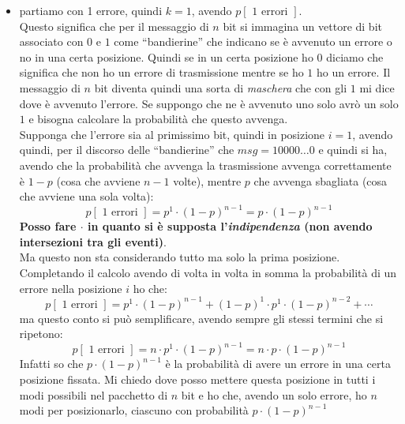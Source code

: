 \documentclass[a4paper,12pt, oneside]{book}
\begin{document}
\begin{itemize}
  \item partiamo con 1 errore, quindi $k=1$, avendo $p[\mbox{ 1 errori }]$.\\
  Questo significa che per il messaggio di $n$ bit si immagina un vettore di bit
  associato con $0$ e $1$ come
  ``bandierine'' che indicano se è avvenuto un errore o no in una certa
  posizione. Quindi se in un 
  certa posizione ho $0$ diciamo che significa che non ho un errore di
  trasmissione mentre se ho $1$ ho un errore. Il messaggio di $n$ bit diventa
  quindi una sorta di \textit{maschera} che con gli $1$ mi dice dove è avvenuto
  l'errore. Se suppongo che ne è avvenuto uno solo avrò un solo $1$ e bisogna
  calcolare la  probabilità che questo avvenga.\\
  Supponga che l'errore sia al primissimo bit, quindi in posizione $i=1$, avendo
  quindi, per il discorso delle ``bandierine'' che $msg=10000\ldots 0$ e quindi
  si ha, avendo che la probabilità che avvenga la trasmissione avvenga
  correttamente è $1-p$ (cosa che avviene $n-1$ volte), mentre $p$ che avvenga
  sbagliata (cosa che avviene una sola volta):
  \[p[\mbox{ 1 errori }]=p^1\cdot(1-p)^{n-1}=p\cdot(1-p)^{n-1}\]
  \textbf{Posso fare $\cdot$ in quanto si è supposta l'\textit{indipendenza}
    (non avendo intersezioni tra gli eventi)}.\\
  Ma questo non sta considerando tutto ma solo la prima posizione. Completando
  il calcolo avendo di volta in volta in somma la probabilità di un errore nella
  posizione $i$ ho che:
  \[p[\mbox{ 1 errori }]=p^1\cdot(1-p)^{n-1}+(1-p)^1\cdot
    p^1\cdot(1-p)^{n-2}+\cdots\]
  ma questo conto si può semplificare, avendo sempre gli stessi termini che si
  ripetono:
  \[p[\mbox{ 1 errori }]=n\cdot p^1\cdot(1-p)^{n-1}=n\cdot p\cdot(1-p)^{n-1}\]
  Infatti so che $p\cdot(1-p)^{n-1}$ è la probabilità di avere un errore in una
  certa 
  posizione fissata. Mi chiedo dove posso mettere questa posizione in tutti i
  modi possibili nel pacchetto di $n$ bit e ho che, avendo un solo errore, ho
  $n$ modi per posizionarlo, ciascuno con probabilità $p\cdot(1-p)^{n-1}$
  

\end{itemize}
\end{document}
